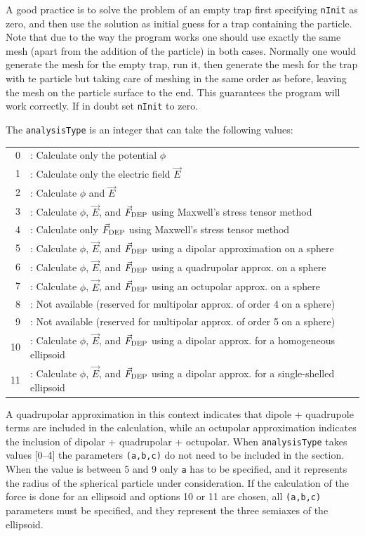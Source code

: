 \documentclass[12pt]{article}
\begin{document}
A good practice is to solve the problem of an empty trap first specifying \verb+nInit+ as zero, and then use the solution as initial guess for a trap containing the particle. Note that due to the way the program works one should use exactly the same mesh (apart from the addition of the particle) in both cases. Normally one would generate the mesh for the empty trap, run it, then generate the mesh for the trap with te particle but taking care of meshing in the same order as before, leaving the mesh on the particle surface to the end. This guarantees the program will work correctly. If in doubt set \verb+nInit+ to zero.

The \verb+analysisType+ is an integer that can take the following values:

\begin{tabular}{rl}
0&: Calculate only the potential $\phi$\\
1&: Calculate only the electric field $\vec{E}$\\
2&: Calculate $\phi$ and $\vec{E}$\\
3&: Calculate $\phi$, $\vec{E}$, and $\vec{F}_{\rm DEP}$ using Maxwell's stress tensor method\\
4&: Calculate only $\vec{F}_{\rm DEP}$ using Maxwell's stress tensor method\\
5&: Calculate $\phi$, $\vec{E}$, and $\vec{F}_{\rm DEP}$ using a dipolar approximation on a sphere\\
6&: Calculate $\phi$, $\vec{E}$, and $\vec{F}_{\rm DEP}$ using a quadrupolar approx. on a sphere\\
7&: Calculate $\phi$, $\vec{E}$, and $\vec{F}_{\rm DEP}$ using an octupolar approx. on a sphere\\
8&: Not available (reserved for multipolar approx. of order 4 on a sphere)\\
9&: Not available (reserved for multipolar approx. of order 5 on a sphere)\\
10&: Calculate $\phi$, $\vec{E}$, and $\vec{F}_{\rm DEP}$ using a dipolar approx. for a homogeneous ellipsoid\\
11&: Calculate $\phi$, $\vec{E}$, and $\vec{F}_{\rm DEP}$ using a dipolar approx. for a single-shelled ellipsoid
\end{tabular}

A quadrupolar approximation in this context indicates that dipole + quadrupole terms are included in the calculation, while an octupolar approximation indicates the inclusion of dipolar + quadrupolar + octupolar. When \verb+analysisType+ takes values [0--4] the parameters \verb+(a,b,c)+ do not need to be included in the section. When the value is between 5 and 9 only \verb+a+ has to be specified, and it represents the radius of the spherical particle under consideration. If the calculation of the force is done for an ellipsoid and options 10 or 11 are chosen, all \verb+(a,b,c)+ parameters must be specified, and they represent the three semiaxes of the ellipsoid. 
\end{document}

